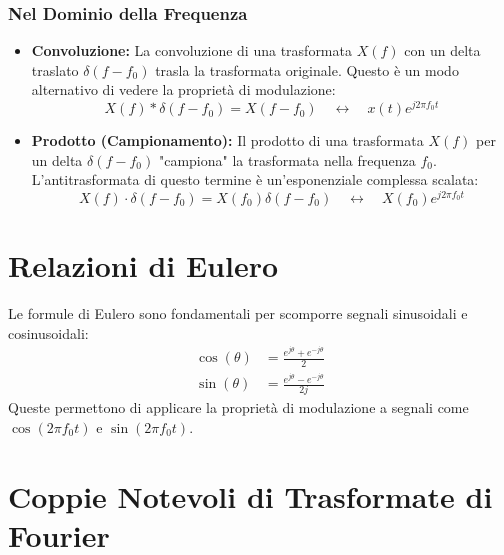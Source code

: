 \subsubsection*{Nel Dominio della Frequenza}
\begin{itemize}
    \item \textbf{Convoluzione:} La convoluzione di una trasformata $X(f)$ con un delta traslato $\delta(f-f_0)$ trasla la trasformata originale. Questo è un modo alternativo di vedere la proprietà di modulazione:
    \begin{equation*}
        X(f) * \delta(f-f_0) = X(f-f_0) \quad \longleftrightarrow \quad x(t)e^{j2\pi f_0 t}
    \end{equation*}
    
    \item \textbf{Prodotto (Campionamento):} Il prodotto di una trasformata $X(f)$ per un delta $\delta(f-f_0)$ "campiona" la trasformata nella frequenza $f_0$. L'antitrasformata di questo termine è un'esponenziale complessa scalata:
    \begin{equation*}
       X(f) \cdot \delta(f-f_0) = X(f_0) \delta(f-f_0) \quad \longleftrightarrow \quad X(f_0) e^{j2\pi f_0 t}
    \end{equation*}
\end{itemize}


\section{Relazioni di Eulero}
Le formule di Eulero sono fondamentali per scomporre segnali sinusoidali e cosinusoidali:
\begin{align*}
    \cos(\theta) &= \frac{e^{j\theta} + e^{-j\theta}}{2} \\
    \sin(\theta) &= \frac{e^{j\theta} - e^{-j\theta}}{2j}
\end{align*}
Queste permettono di applicare la proprietà di modulazione a segnali come $\cos(2\pi f_0 t)$ e $\sin(2\pi f_0 t)$.

\section{Coppie Notevoli di Trasformate di Fourier}

